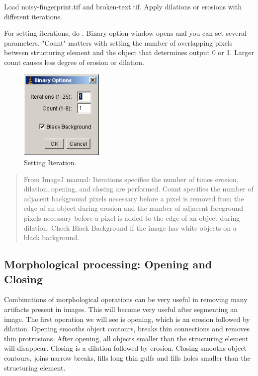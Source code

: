 \begin{indentexercise}{1}
Load noisy-fingerprint.tif and broken-text.tif. Apply dilations or
erosions with different iterations. 

For setting iterations, do . 
Binary option window opens and you can set
several parameters. "Count"
matters with setting the number of overlapping pixels between
structuring element and the object that determines output 0 or 1.
Larger count causes less degree of erosion or dilation.

\begin{figure}[htbp]
\begin{center}
\includegraphics[width=4cm]{img/CMCIBasicCourse201102-img67.png}
\caption{ Setting Iteration.}
\label{fig:img67}
\end{center}
\end{figure}
\end{indentexercise}

\begin{quote}
From ImageJ manual: Iterations specifies the number of times erosion,
dilation, opening, and closing are performed. Count specifies the
number of adjacent background pixels necessary before a pixel is
removed from the edge of an object during erosion and the number of
adjacent foreground pixels necessary before a pixel is added to the
edge of an object during dilation. Check Black Background if the image
has white objects on a black background.
\end{quote}

\subsection{Morphological processing: Opening and Closing}

Combinations of morphological operations can be very useful in removing
many artifacts present in images. This will become very useful after
segmenting an image. The first operation we will see is opening, which
is an erosion followed by dilation. Opening smooths object contours,
breaks thin connections and removes thin protrusions. After opening,
all objects smaller than the structuring element will disappear.
Closing is a dilation followed by erosion. Closing smooths object
contours, joins narrow breaks, fills long thin gulfs and fills holes
smaller than the structuring element.

